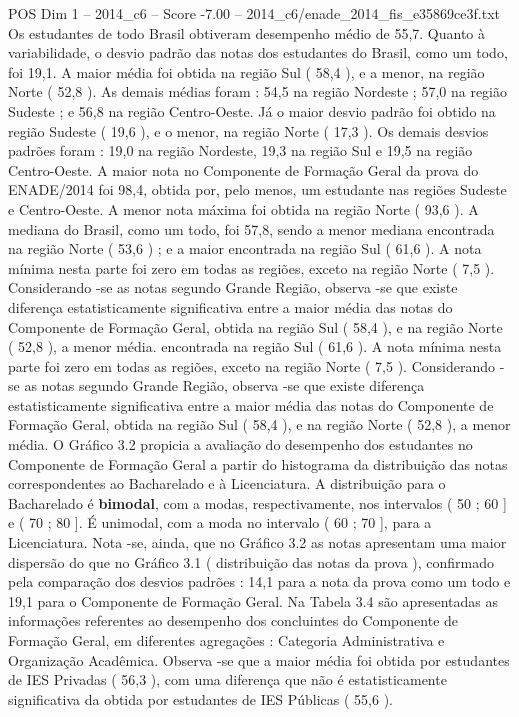 \begin{textsample}{POS Dim 1 – 2014\_c6 – Score -7.00 – 2014\_c6/enade\_2014\_fis\_e35869ce3f.txt}
Os estudantes de todo Brasil obtiveram desempenho médio de 55,7.
Quanto à variabilidade, o desvio padrão das notas dos estudantes do Brasil, como um todo, foi 19,1.
A maior média foi obtida na região Sul ( 58,4 ), e a menor, na região Norte ( 52,8 ).
As demais médias foram : 54,5 na região Nordeste ; 57,0 na região Sudeste ; e 56,8 na região Centro-Oeste.
Já o maior desvio padrão foi obtido na região Sudeste ( 19,6 ), e o menor, na região Norte ( 17,3 ).
Os demais desvios padrões foram : 19,0 na região Nordeste, 19,3 na região Sul e 19,5 na região Centro-Oeste.
A maior nota no Componente de Formação Geral da prova do ENADE/2014 foi 98,4, obtida por, pelo menos, um estudante nas regiões Sudeste e Centro-Oeste.
A menor nota máxima foi obtida na região Norte ( 93,6 ).
A mediana do Brasil, como um todo, foi 57,8, sendo a menor mediana encontrada na região Norte ( 53,6 ) ; e a maior encontrada na região Sul ( 61,6 ).
A nota mínima nesta parte foi zero em todas as regiões, exceto na região Norte ( 7,5 ).
Considerando -se as notas segundo Grande Região, observa -se que existe diferença estatisticamente significativa entre a maior média das notas do Componente de Formação Geral, obtida na região Sul ( 58,4 ), e na região Norte ( 52,8 ), a menor média. encontrada na região Sul ( 61,6 ).
A nota mínima nesta parte foi zero em todas as regiões, exceto na região Norte ( 7,5 ).
Considerando -se as notas segundo Grande Região, observa -se que existe diferença estatisticamente significativa entre a maior média das notas do Componente de Formação Geral, obtida na região Sul ( 58,4 ), e na região Norte ( 52,8 ), a menor média.
O Gráfico 3.2 propicia a avaliação do desempenho dos estudantes no Componente de Formação Geral a partir do histograma da distribuição das notas correspondentes ao Bacharelado e à Licenciatura.
A distribuição para o Bacharelado é \textbf{bimodal}, com a modas, respectivamente, nos intervalos ( 50 ; 60 ] e ( 70 ; 80 ].
É unimodal, com a moda no intervalo ( 60 ; 70 ], para a Licenciatura.
Nota -se, ainda, que no Gráfico 3.2 as notas apresentam uma maior dispersão do que no Gráfico 3.1 ( distribuição das notas da prova ), confirmado pela comparação dos desvios padrões : 14,1 para a nota da prova como um todo e 19,1 para o Componente de Formação Geral.
Na Tabela 3.4 são apresentadas as informações referentes ao desempenho dos concluintes do Componente de Formação Geral, em diferentes agregações : Categoria Administrativa e Organização Acadêmica.
Observa -se que a maior média foi obtida por estudantes de IES Privadas ( 56,3 ), com uma diferença que não é estatisticamente significativa da obtida por estudantes de IES Públicas ( 55,6 ).

\end{textsample}

